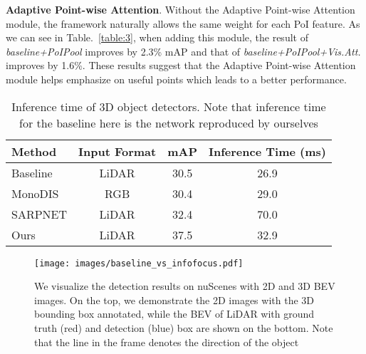 \documentclass[runningheads]{llncs}
\begin{document}
\noindent\textbf{Adaptive Point-wise Attention}.
Without the Adaptive Point-wise Attention module, the framework naturally allows the same weight for each PoI feature. As we can see in Table.~\ref{table:3}, when adding this module, the result of \emph{baseline+PoIPool} improves by 2.3\% mAP and that of \emph{baseline+PoIPool+Vis.Att.} improves by 1.6\%. These results suggest that the Adaptive Point-wise Attention module helps emphasize on useful points which leads to a better performance.


\begin{table}[]
\centering
\caption{Inference time of 3D object detectors. Note that inference time for the baseline here is the network reproduced by ourselves}
\label{table:4}
\medskip

\begin{tabular}{l@{\ \ \ \ \ } c@{\ \ \ \ \ }  c@{\ \ \ \ \ } c@{\ \ \ \ \ }} 
 \hline
 Method & Input Format & mAP &  Inference Time (ms) \\[0.5ex]
 \hline
Baseline \cite{lang2019PointPillars} & LiDAR & 30.5 & 26.9 \\
MonoDIS \cite{simonelli2019disentangling} & RGB & 30.4 & 29.0  \\
SARPNET \cite{ye2020sarpnet} & LiDAR & 32.4& 70.0  \\
\hline
Ours & LiDAR & 37.5 & 32.9 \\

\hline
\end{tabular}

\end{table}

\begin{figure}[t]
\centering
  \texttt{[image: images/baseline\_vs\_infofocus.pdf]}
  \\
  \caption{We visualize the detection results on nuScenes with 2D and 3D BEV images. On the top, we demonstrate the 2D images with the 3D bounding box annotated, while the BEV of LiDAR with ground truth (red) and detection (blue) box are shown on the bottom. Note that the line in the frame denotes the direction of the object}
\label{fig:visualization_2D_3D}
\end{figure}
\end{document}
